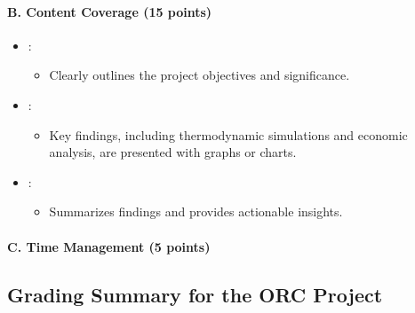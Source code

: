 \documentclass[letterpaper,10pt,english]{jupyterBook}
\begin{document}
\paragraph{B. Content Coverage (15 points)}
\label{\detokenize{ProjectInstructions:id12}}\begin{itemize}
\item {} 
\sphinxAtStartPar
{}:
\begin{itemize}
\item {} 
\sphinxAtStartPar
Clearly outlines the project objectives and significance.

\end{itemize}

\item {} 
\sphinxAtStartPar
{}:
\begin{itemize}
\item {} 
\sphinxAtStartPar
Key findings, including thermodynamic simulations and economic
analysis, are presented with graphs or charts.

\end{itemize}

\item {} 
\sphinxAtStartPar
{}:
\begin{itemize}
\item {} 
\sphinxAtStartPar
Summarizes findings and provides actionable insights.

\end{itemize}

\end{itemize}


\paragraph{C. Time Management (5 points)}
\label{\detokenize{ProjectInstructions:id13}}

\subsection{Grading Summary for the ORC Project}
\label{\detokenize{ProjectInstructions:grading-summary-for-the-orc-project}}
\end{document}
